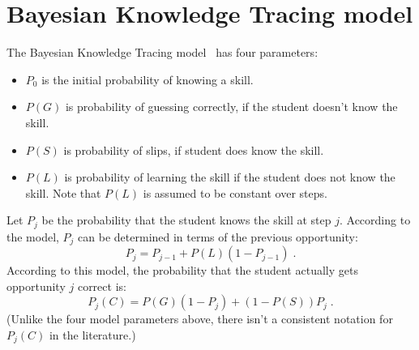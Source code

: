 \documentclass{acmlarge-edm}
\begin{document}


\section{Bayesian Knowledge Tracing model}

The Bayesian Knowledge Tracing model~\cite{corbett_knowledge_1994} has four parameters:
%
\begin{itemize}
   \item $P_0$ is the initial probability of knowing a skill.
   \item $P(G)$ is probability of guessing correctly, if the student        
         doesn't know the skill.
   \item $P(S)$ is probability of slips, if student does know the skill.
   \item $P(L)$ is probability of learning the skill if the student 
         does not know the skill.  Note that $P(L)$ is assumed to 
         be constant over steps.
\end{itemize}
%
Let $P_j$ be the probability that the student knows the skill at 
step $j$. According to the model,  $P_j$ can
be determined in terms of the previous opportunity:
%
\begin{equation}
          P_j = P_{j-1} + P(L)\left(1-P_{j-1}\right)  \; . \label{recurse}
\end{equation}
%
According to this model, the probability that the student actually gets
opportunity $j$ correct is:
%
\begin{equation}
         P_j(C) = P(G)\left(1-P_j\right) + \left(1-P(S)\right) P_j \; . \label{pnc}
\end{equation}
%
(Unlike the four model parameters above, there isn't a consistent
notation for $P_j(C)$ in the literature.)
\end{document}
